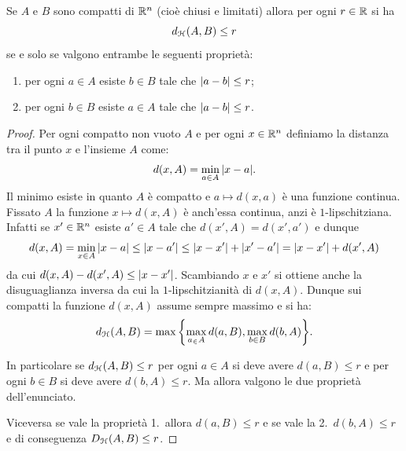 \begin{theorem}
Se $A$ e $B$ sono compatti di $\mathbb R^n$ (cioè chiusi e limitati) allora
per ogni $r \in \mathbb R$
si ha
\[
  d_\mathcal H(A,B) \le r
\]
se e solo se valgono entrambe le seguenti proprietà:
\begin{enumerate}
\item per ogni $a\in A$ esiste $b\in B$ tale che ${\left|a-b\right|}\le r$;
\item per ogni $b\in B$ esiste $a\in A$ tale che ${\left|a-b\right|}\le r$.
\end{enumerate}
\end{theorem}
%
\begin{proof}
Per ogni compatto non vuoto $A$ e per ogni $x\in \mathbb R^n$ definiamo
la distanza tra il punto $x$ e l'insieme $A$ come:
\[
  d(x,A) = \min_{a\in A} {\left|x-a\right|}.
\]
Il minimo esiste in quanto $A$ è compatto e $a\mapsto d(x,a)$ è una funzione continua. Fissato $A$ la funzione $x\mapsto d(x,A)$ è anch'essa continua, anzi è $1$-lipschitziana. Infatti se $x'\in \mathbb R^n$ esiste $a'\in A$ tale che $d(x',A) = d(x',a')$ e dunque
\[
  d(x,A) = \min_{x\in A} {\left|x-a\right|} \le {\left|x-a'\right|} \le {\left|x-x'\right|} + {\left|x'- a'\right|}
   = {\left|x-x'\right|} + d(x',A)
\]
da cui $d(x,A) - d(x',A)\le {\left|x-x'\right|}$.
Scambiando $x$ e $x'$ si ottiene anche la disuguaglianza inversa da cui la $1$-lipschitzianità di $d(x,A)$. Dunque sui compatti la funzione $d(x,A)$ assume sempre massimo e si ha:
\[
d_\mathcal H(A,B) = \max{\left\{ \max_{a_\in A} d(a,B), \max_{b\in B} d(b,A) \right\}}.
\]

In particolare se $d_\mathcal H(A,B) \le r$ per ogni $a\in A$ si deve avere $d(a,B) \le r$ e per ogni $b\in B$ si deve avere $d(b,A) \le r$. Ma allora valgono le due proprietà dell'enunciato.

Viceversa se vale la proprietà 1.\ allora $d(a,B)\le r$ e se vale la 2.\ $d(b,A)\le r$ e di conseguenza $D_\mathcal H(A,B) \le r$.
\end{proof}

